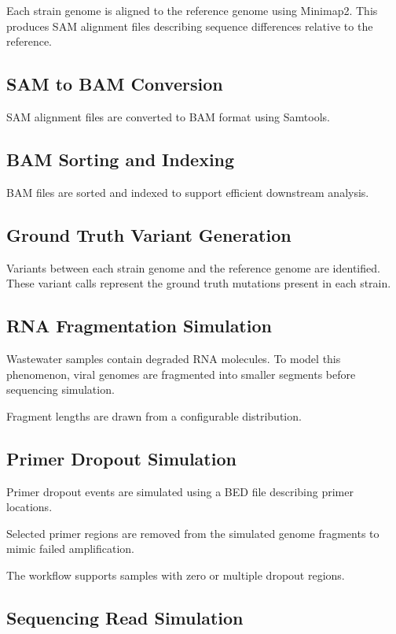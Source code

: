 \documentclass[11pt]{article}
\begin{document}
Each strain genome is aligned to the reference genome using Minimap2.  
This produces SAM alignment files describing sequence differences relative to the reference.

\subsection{SAM to BAM Conversion}

SAM alignment files are converted to BAM format using Samtools.

\subsection{BAM Sorting and Indexing}

BAM files are sorted and indexed to support efficient downstream analysis.

\subsection{Ground Truth Variant Generation}

Variants between each strain genome and the reference genome are identified.  
These variant calls represent the ground truth mutations present in each strain.

\subsection{RNA Fragmentation Simulation}

Wastewater samples contain degraded RNA molecules.  
To model this phenomenon, viral genomes are fragmented into smaller segments before sequencing simulation.

Fragment lengths are drawn from a configurable distribution.

\subsection{Primer Dropout Simulation}

Primer dropout events are simulated using a BED file describing primer locations.

Selected primer regions are removed from the simulated genome fragments to mimic failed amplification.

The workflow supports samples with zero or multiple dropout regions.

\subsection{Sequencing Read Simulation}
\end{document}
